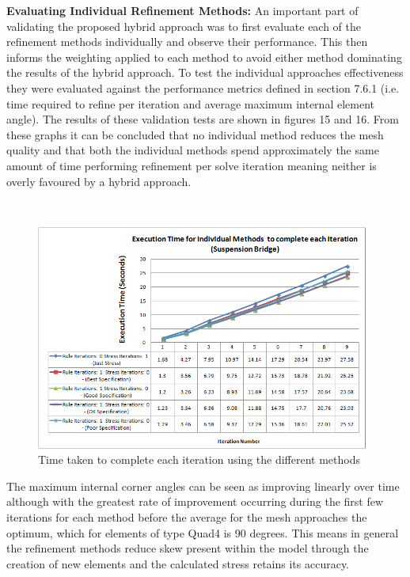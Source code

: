 \noindent
\textbf{Evaluating Individual Refinement Methods: } 
\noindent
 An important part of validating the proposed hybrid approach was to first evaluate each of the refinement methods individually and observe their performance. This then informs the weighting applied to each method to avoid either method dominating the results of the hybrid approach. To test the individual approaches effectiveness they were evaluated against the performance metrics defined in section 7.6.1 (i.e. time required to refine per iteration and average maximum internal element angle). The results of these validation tests are shown in figures 15 and 16. From these graphs it can be concluded that no individual method reduces the mesh quality and that both the individual methods spend approximately the same amount of time performing refinement per solve iteration meaning neither is overly favoured by a hybrid approach.
  

\noindent
 \\




\begin{figure}[H]
  \centerline{\includegraphics[width=110mm, scale=1]{../Graphics/FinalReportGraphs/ExecutionTimeIndividualMethodsSuspensionBridge.png}}
  \caption{Time taken to complete each iteration using the different methods}
  \label{fig:sub1}
\end{figure}  





 
\noindent
The maximum internal corner angles can be seen as improving linearly over time although with the greatest rate of improvement occurring during the first few iterations for each method before the average for the mesh approaches the optimum, which for elements of type Quad4 is 90 degrees. This means in general the refinement methods reduce skew present within the model through the creation of new elements and the calculated stress retains its accuracy. 

